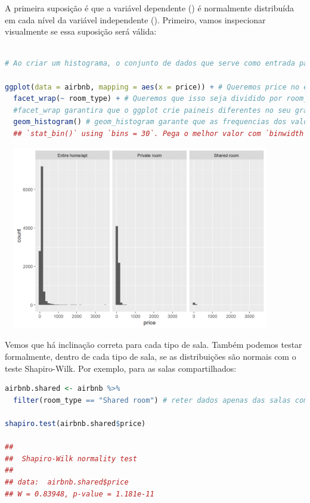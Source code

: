 \documentclass{article}
\begin{document}
A primeira suposição é que a variável dependente () é normalmente distribuída em cada nível da variável independente (). Primeiro, vamos inspecionar visualmente se essa suposição será válida:

\begin{lstlisting}[language=R]

# Ao criar um histograma, o conjunto de dados que serve como entrada para o ggplot eh o conjunto de dados completo, nao o resumo com os meios

ggplot(data = airbnb, mapping = aes(x = price)) + # Queremos price no eixo x.
  facet_wrap(~ room_type) + # Queremos que isso seja dividido por room_type.
  #facet_wrap garantira que o ggplot crie paineis diferentes no seu gráfico.
  geom_histogram() # geom_histogram garante que as frequencias dos valores no eixo X sejam plotadas.
  ## `stat_bin()` using `bins = 30`. Pega o melhor valor com `binwidth`.
\end{lstlisting}


\begin{center}
\includegraphics[width=12cm,height=8cm]{modelling_histogram-1.png} 
\end{center}

Vemos que há inclinação correta para cada tipo de sala. Também podemos testar formalmente, dentro de cada tipo de sala, se as distribuições são normais com o teste Shapiro-Wilk. Por exemplo, para as salas compartilhados:

\begin{lstlisting}[language=R]
airbnb.shared <- airbnb %>% 
  filter(room_type == "Shared room") # reter dados apenas das salas compartilhadas

shapiro.test(airbnb.shared$price)

## 
##  Shapiro-Wilk normality test
## 
## data:  airbnb.shared$price
## W = 0.83948, p-value = 1.181e-11

\end{lstlisting}
\end{document}
